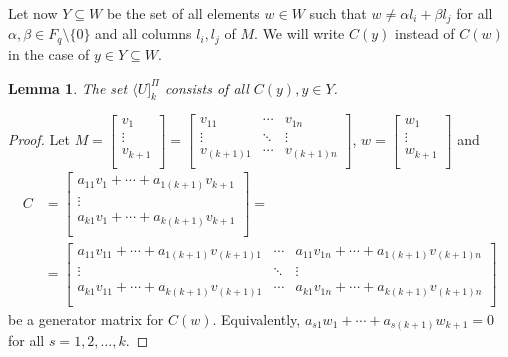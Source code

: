 \documentclass[12pt]{article}
\newtheorem{lemma}{Lemma}
\theoremstyle{definition}
\begin{document}
Let now $Y\subseteq W$ be the set of all elements $w\in W$ such that $w\neq \alpha l_i+\beta l_j$ for all $\alpha, \beta\in F_q\setminus\{0\}$ and all columns $l_i, l_j$ of $M$. We will write $C(y)$ instead of $C(w)$ in the case of $y\in Y\subseteq W$.
 \begin{lemma}\label{ukpi}
   The set $\langle U]^{\Pi}_{k}$ consists of all $C(y), y\in Y$.
 \end{lemma}
 \begin{proof}
   Let $M=\left[
\begin{array}{cccc}
v_1\\
\vdots\\
v_{k+1}\\
\end{array}
\right]=\left[
\begin{array}{cccc}
v_{11}& \cdots &v_{1n}\\
\vdots&\ddots&\vdots\\
v_{(k+1)1}& \cdots &v_{(k+1)n}\\
\end{array}
\right]$, $w=\left[
\begin{array}{cccc}
w_1\\
\vdots\\
w_{k+1}\\
\end{array}
\right]$ and \begin{align*}
C&=\left[\begin{array}{c}
a_{11}v_{1}+ \cdots +a_{1(k+1)}v_{k+1}\\
\vdots\\
a_{k1}v_{1}+ \cdots +a_{k(k+1)}v_{k+1}\\
\end{array}
\right]=\\
              &=\left[\begin{array}{ccc}
a_{11}v_{11}+ \cdots +a_{1(k+1)}v_{(k+1)1}& \cdots &a_{11}v_{1n}+ \cdots +a_{1(k+1)}v_{(k+1)n}\\
\vdots&\ddots&\vdots\\
a_{k1}v_{11}+ \cdots +a_{k(k+1)}v_{(k+1)1}& \cdots &a_{k1}v_{1n}+ \cdots +a_{k(k+1)}v_{(k+1)n}\\
\end{array}
\right]      \end{align*} be a generator matrix for $C(w)$. Equivalently, $
a_{s1}w_{1}+ \cdots +a_{s(k+1)}w_{k+1}=0$ for all $s=1,2, \dots, k$.


\end{proof}
\end{document}
